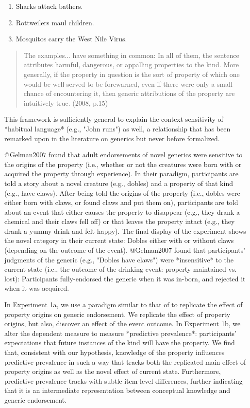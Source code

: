 \documentclass[floatsintext, 11pt, doc]{apa6}
\begin{document}
\begin{enumerate}
\item Sharks attack bathers.
\item Rottweilers maul children. 
\item Mosquitos carry the West Nile Virus.
\end{enumerate}


\begin{quote}
The examples... have something in common: In all of them, the sentence attributes harmful, dangerous, or appalling properties to the kind. More generally, if the property in question is the sort of property of which one would be well served to be forewarned, even if there were only a small chance of encountering it, then generic attributions of the property are intuitively true. (2008, p.15)
\end{quote}

\noindent 


This framework is sufficiently general to explain the context-sensitivity of *habitual language* (e.g., "John runs") as well, a relationship that has been remarked upon in the literature on generics \cite{Carlson, Leslie} but never before formalized. 

@Gelman2007 found that adult endorsements of novel generics were sensitive to the origins of the property (i.e., whether or not the creatures were born with or acquired the property through experience).
In their paradigm, participants are told a story about a novel creature (e.g., dobles) and a property of that kind (e.g., have claws).
After being told the origins of the property (i.e., dobles were either born with claws, or found claws and put them on), participants are told about an event that either causes the property to disappear (e.g., they drank a chemical and their claws fell off) or that leaves the property intact (e.g., they drank a yummy drink and felt happy).
The final display of the experiment shows the novel category in their current state: Dobles either with or without claws (depending on the outcome of the event).
@Gelman2007 found that participants' judgments of the generic (e.g., "Dobles have claws") were *insensitive* to the current state (i.e., the outcome of the drinking event: property maintained vs. lost): Participants fully-endorsed the generic when it was in-born, and rejected it when it was acquired.

In Experiment 1a, we use a paradigm similar to that of  to replicate the effect of property origins on generic endorsement.
We replicate the effect of property origins, but also, discover an effect of the event outcome.
In Experiment 1b, we alter the dependent measure to measure *predictive prevalence*: participants' expectations that future instances of the kind will have the property.
We find that, consistent with our hypothesis, knowledge of the property influences predictive prevalence in such a way that tracks both the replicated main effect of property origins as well as the novel effect of current state.
Furthermore, predictive prevalence tracks with subtle item-level differences, further indicating that it is an intermediate representation between conceptual knowledge and generic endorsement.
\end{document}
